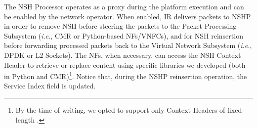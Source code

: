 
The NSH Processor operates as a proxy during the platform execution and can be enabled by the network operator. When enabled, IR delivers packets to NSHP in order to remove NSH before steering the packets to the Packet Processing Subsystem (\textit{i.e.}, CMR or Python-based NFs/VNFCs), and for NSH reinsertion before forwarding processed packets back to the Virtual Network Subsystem (\textit{i.e.}, DPDK or L2 Sockets). The NFs, when necessary, can access the NSH Context Header to retrieve or replace content using specific libraries we developed (both in Python and CMR)\footnote{By the time of writing, we opted to support only Context Headers of fixed-length \cite{Quinn-2018}.}. Notice that, during the NSHP reinsertion operation, the Service Index field is updated.


